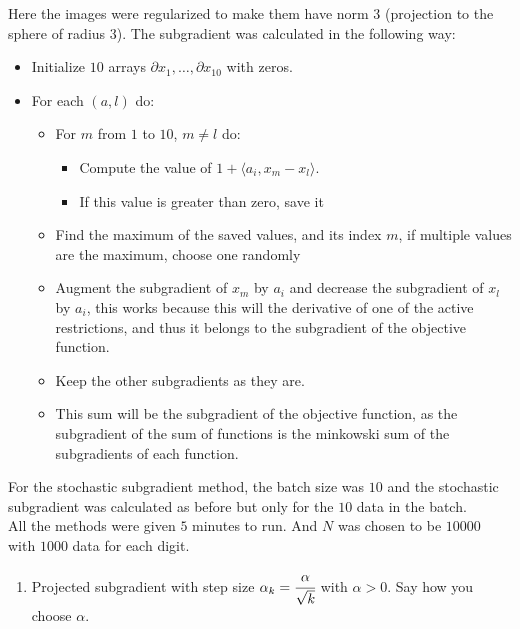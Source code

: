 \documentclass[10pt]{article}
\begin{document}
Here the images were regularized to make them have norm $3$ (projection to the sphere of radius $3$). The subgradient was calculated in the following way:

\begin{itemize}
  \item Initialize $10$ arrays $\partial x_1, \ldots,\partial x_{10}$ with zeros.
  \item For each $(a, l)$ do:
  \begin{itemize}
    \item For $m$ from $1$ to $10$, $m \neq l$ do:
    \begin{itemize}
      \item Compute the value of $1+ \langle a_i, x_m - x_{l} \rangle$.
      \item If this value is greater than zero, save it
    \end{itemize}
    \item Find the maximum of the saved values, and its index $m$, if multiple values are the maximum, choose one randomly
    \item Augment the subgradient of $x_m$ by $a_i$ and decrease the subgradient of $x_l$ by $a_i$, this works because this will the derivative of one of the active restrictions, and thus it belongs to the subgradient of the objective function.
    \item Keep the other subgradients as they are. 
    \item This sum will be the subgradient of the objective function, as the subgradient of the sum of functions is the minkowski sum of the subgradients of each function.

  \end{itemize}
\end{itemize}

For the stochastic subgradient method, the batch size was $10$ and the stochastic subgradient was calculated as before but only for the $10$ data in the batch.\\

All the methods were given $5$ minutes to run. And $N$ was chosen to be $10000$ with $1000$ data for each digit.\\

\begin{enumerate}[label=\alph*)]
  \item Projected subgradient with step size $\alpha_k = \cfrac{\alpha}{\sqrt{k}}$ with $\alpha >0$. Say how you choose $\alpha$.
\end{enumerate}
\end{document}
